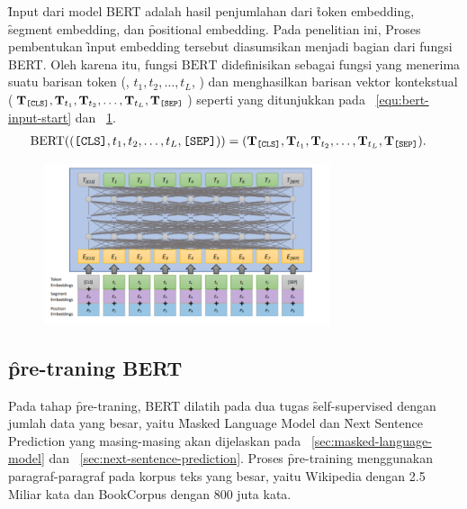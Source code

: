 \f{Input} dari model BERT adalah hasil penjumlahan dari \f{token embedding}, \f{segment embedding}, dan \f{positional embedding}. Pada penelitian ini, Proses pembentukan \f{input embedding} tersebut diasumsikan menjadi bagian dari fungsi BERT. Oleh karena itu, fungsi $\text{BERT}$ didefinisikan sebagai fungsi yang menerima suatu barisan token (\code{[CLS]}, $t_1, t_2, \dots, t_L$, \code{[SEP]}) dan menghasilkan barisan vektor kontekstual ($\mathbf{T}_{\text{\texttt{[CLS]}}}, \mathbf{T}_{t_1}, \mathbf{T}_{t_2}, \dots, \mathbf{T}_{t_L}, \mathbf{T}_{\text{\texttt{[SEP]}}}$) seperti yang ditunjukkan pada \equ~\ref{equ:bert-input-start} dan \pic~\ref{fig:input-representation}.
\begin{align}
	\label{equ:bert-input-start}
	\text{BERT}((\text{\texttt{[CLS]}}, t_1, t_2, \dots, t_L, \text{\texttt{[SEP]}})) &= (\mathbf{T}_{\text{\texttt{[CLS]}}}, \mathbf{T}_{t_1}, \mathbf{T}_{t_2}, \dots, \mathbf{T}_{t_L}, \mathbf{T}_{\text{\texttt{[SEP]}}}).
\end{align}
\begin{figure}
	\centering
	\includegraphics[width=0.75\textwidth]{assets/pics/representasibert.png}
	\label{fig:input-representation}
\end{figure}

\subsection{\f{pre-traning} BERT}

	Pada tahap \f{pre-traning}, BERT dilatih pada dua tugas \f{self-supervised} dengan jumlah data yang besar, yaitu \f{Masked Language Model} dan \f{Next Sentence Prediction} yang masing-masing akan dijelaskan pada \sect~\ref{sec:masked-language-model} dan \sect~\ref{sec:next-sentence-prediction}. Proses \f{pre-training} menggunakan paragraf-paragraf pada korpus teks yang besar, yaitu Wikipedia dengan 2.5 Miliar kata dan BookCorpus dengan 800 juta kata.


